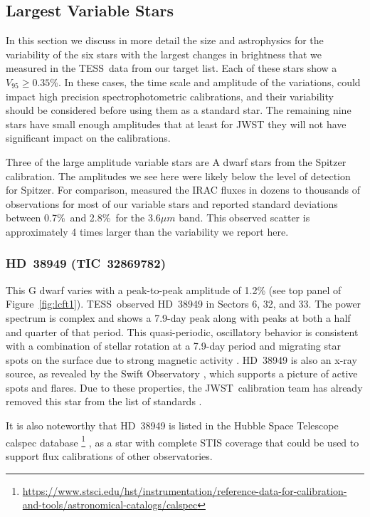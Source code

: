 \documentclass[twocolumn]{aastex631}
\newcommand{\jwst}{JWST}
\newcommand{\tess}{TESS}
\begin{document}
\subsection{Largest Variable Stars}

In this section we discuss in more detail the size and astrophysics for the variability of the six stars with the largest changes in brightness that we measured in the \tess\ data from our target list. Each of these stars show a $V_{95}\ge0.35$\%. In these cases, the time scale and amplitude of the variations, could impact high precision spectrophotometric calibrations, and their variability should be considered before using them as a standard star. The remaining nine stars have small enough amplitudes that at least for JWST they will not have significant impact on the calibrations. 

Three of the large amplitude variable stars are A dwarf stars from the \citet{Reach2005} Spitzer calibration. The amplitudes we see here were likely below the level of detection for Spitzer. For comparison, \citet{Krick2021IRAC} measured the IRAC fluxes in dozens to thousands of observations for most of our variable stars and reported standard deviations between 0.7\%\ and 2.8\%\ for the 3.6$\mu m$ band.  This observed scatter is approximately 4 times larger than the variability we report here.


\subsubsection{HD~38949 (TIC~32869782)}

This G dwarf varies with a peak-to-peak amplitude of 1.2\% (see top panel of Figure~\ref{fig:lcft1}). \tess\ observed HD~38949 in Sectors 6, 32, and 33.  The power spectrum is complex and shows a 7.9-day peak along with peaks at both a half and quarter of that period. This quasi-periodic, oscillatory behavior is consistent with a combination of stellar rotation at a 7.9-day period and migrating star spots on the surface due to strong magnetic activity \citep{Santos2021}.  HD~38949 is also an x-ray source, as revealed by the Swift Observatory \citep{Swift2020,Evans2020vizier}, which supports a picture of active spots and flares. Due to these properties, the \jwst\ calibration team has already removed this star from the list of standards \citep{Gordon2022inprep}.

It is also noteworthy that HD~38949 is listed in the Hubble Space Telescope calspec database  \footnote{\url{https://www.stsci.edu/hst/instrumentation/reference-data-for-calibration-and-tools/astronomical-catalogs/calspec}} \citep{Bohlin2014PASP126}, as a star with complete STIS coverage that could be used to support flux calibrations of other observatories.
\end{document}
